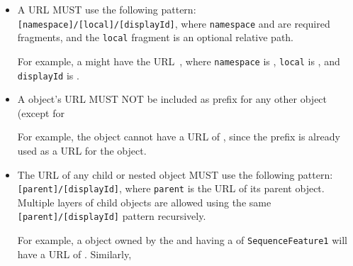 \begin{itemize}

 \item A  URL MUST use the following pattern:
  \texttt{[namespace]/[local]/[displayId]},  where \texttt{namespace} and  are required fragments, and the \texttt{local} fragment is an optional relative path.
  
  	For example, a  might have the URL~, where \texttt{namespace} is , \texttt{local} is , and \texttt{displayId} is .

  \item A  object's URL MUST NOT be included as prefix for any other  object (except for  
  
  	For example, the   object cannot have a URL of , since the  prefix is already used as a URL for the   object.

  \item The URL of any child or nested object MUST use the following pattern:\texttt{[parent]/[displayId]}, where \texttt{parent} is the URL of its parent object.
	Multiple layers of child objects are allowed using the same\\ \texttt{[parent]/[displayId]} pattern recursively.
	
	For example, a  object owned by the   and having a  of  \texttt{SequenceFeature1} will have a URL of .
	Similarly,  
  \end{itemize}

